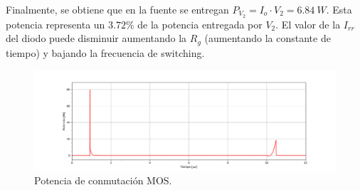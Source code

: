 Finalmente, se obtiene que en la fuente se entregan $P_{V_2}=I_o \cdot V_2 = 6.84 \ W$. Esta potencia representa un $3.72 \%$ de la potencia entregada por $V_2$.
El valor de la $I_{rr}$ del diodo puede disminuir aumentando la $R_g$ (aumentando la constante de tiempo) y bajando la frecuencia de switching. 
\begin{figure}[H]
	\centering
	\includegraphics[width=\linewidth]{ImagenesEjercicio-3/potencia-mos}
	\caption{Potencia de conmutación MOS.}
	\label{fig:ej3:conmutacionON_OFF_VDS_IDS_SWITCH_BOOST}
\end{figure}

